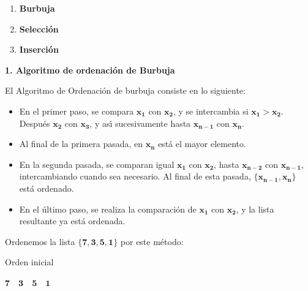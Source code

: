 \documentclass[ebook,oneside]{memoir}
\newcommand{\celeste}[1]{\textcolor{cyan}{#1}}
\newcommand{\bolds}[1]{\boldsymbol{#1}}
\begin{document}
    \begin{enumerate}
        \item \textbf{Burbuja}
        \item \textbf{Selecci\'{o}n}
        \item \textbf{Inserci\'{o}n}
    \end{enumerate}




\textbf{1. Algoritmo de ordenaci\'{o}n de Burbuja}

 \vspace{0.5cm}
 El Algoritmo de Ordenaci\'{o}n de burbuja consiste en lo siguiente:
        \begin{itemize}
            \item En el primer paso, se compara $\bolds{x_1}$ con $\bolds{x_2}$, y se intercambia si $\bolds{x_1>x_2}$. Despu\'{e}s $\bolds{x_2}$ con $\bolds{x_3}$, y as\'{\i} sucesivamente hasta $\bolds{x_{n-1}}$ con $\bolds{x_n}$.
            \item Al final de la primera pasada, en $\bolds{x_n}$ est\'{a} el mayor elemento.
            \item En la segunda pasada, se comparan igual $\bolds{x_1}$ con $\bolds{x_2}$, hasta $\bolds{x_{n-2}}$ con $\bolds{x_{n-1}}$, intercambiando cuando sea necesario. Al final de esta pasada, $\bolds{\{x_{n-1},x_n\}}$ est\'{a} ordenado.
            \item En el \'{u}ltimo paso, se realiza la comparaci\'{o}n de $\bolds{x_1}$ con $\bolds{x_2}$, y la lista resultante ya est\'{a} ordenada.
        \end{itemize}

\vspace*{0.5cm}

 Ordenemos la lista $\bolds{\{7, 3, 5, 1\}}$  por este m\'{e}todo:
 \vspace{0.2cm}

        \begin{minipage}{.6\textwidth}
        Orden inicial
        \end{minipage}\hfill
        \begin{minipage}{.3\textwidth}
        $\bolds{7\quad 3\quad 5\quad 1}$
        \end{minipage}

        \vspace*{0.2cm}
\end{document}
